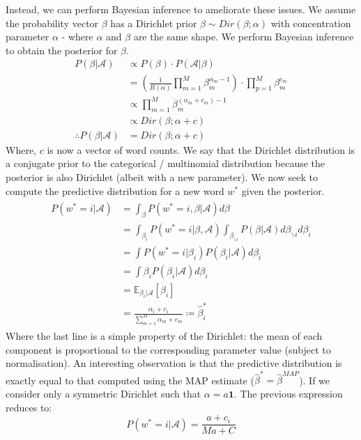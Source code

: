 \documentclass[]{article}
\newcommand{\Acal}{\mathcal{A}}
\newcommand{\Expect}{\mathbb{E}}
\begin{document}
Instead, we can perform Bayesian inference to ameliorate these issues. We assume the probability vector $\beta$ has a Dirichlet prior $\beta \sim Dir(\beta ; \alpha)$ with concentration parameter $\alpha$ - where $\alpha$ and $\beta$ are the same shape. We perform Bayesian inference to obtain the posterior for $\beta$.
%
\begin{align}
	P(\beta | \Acal) &\propto P(\beta) \cdot P(\Acal | \beta) \nonumber \\
	&= \left( \frac{1}{B(\alpha)} \prod_{m = 1}^{M} \beta_m^{\alpha_m -1} \right) \cdot \prod_{p=1}^{M} \beta_m^{c_m} \nonumber \\
	&\propto \prod_{m = 1}^{M} \beta_m^{(\alpha_m + c_m) -1} \nonumber \\
	&\propto Dir(\beta ; \alpha + c) \nonumber \\
	\therefore P(\beta | \Acal) &= Dir(\beta ; \alpha + c)
	\label{eqn:posterior}
\end{align}
%
Where, $c$ is now a vector of word counts. We say that the Dirichlet distribution is a conjugate prior to the categorical / multinomial distribution because the posterior is also Dirichlet (albeit with a new parameter). We now seek to compute the predictive distribution for a new word $w^*$ given the posterior.
%
\begin{align}
\begin{split}
	P(w^* = i | \Acal) &= \int_{\beta} P(w^* = i, \beta | \Acal) d\beta \\
	&= \int_{\beta_i} P(w^* = i | \beta , \Acal) \int_{\beta_{\backslash i}} P(\beta | \Acal) d\beta_{\backslash i} d\beta_i \\
	&= \int P(w^* = i | \beta_i) P(\beta_i | \Acal) d\beta_i \\
	&= \int \beta_i P(\beta_i | \Acal) d\beta_i \\
	&= \Expect_{\beta_i | \Acal} [\beta_i] \\
	&= \frac{\alpha_i + c_i}{\sum_{m=1}^{M} \alpha_m + c_m} \coloneqq \hat{\beta}^*_i
\end{split}
\end{align}
%
Where the last line is a simple property of the Dirichlet: the mean of each component is proportional to the corresponding parameter value (subject to normalisation). An interesting observation is that the predictive distribution is exactly equal to that computed using the MAP estimate ($\hat{\beta}^* = \hat{\beta}^{MAP}$). If we consider only a symmetric Dirichlet such that $\alpha = a \mathbf{1}$. The previous expression reduces to:
%
\begin{equation}
	P(w^* = i | \Acal) = \frac{a + c_i}{Ma + C}
	\label{eqn:pred-bayes}
\end{equation}
\end{document}

